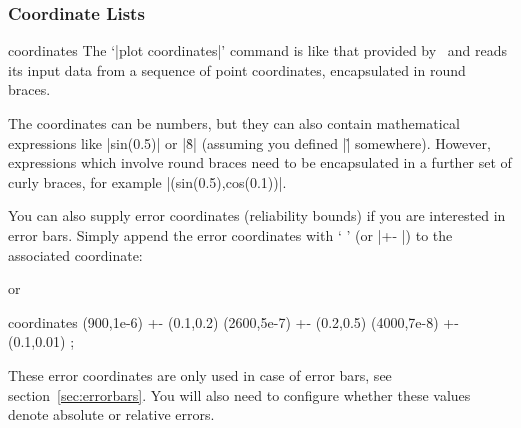 {\begin{addplot+}
\begin{codeexample}[]
\end{codeexample}
\end{addplot+}

\subsubsection{Coordinate Lists}
\label{pgfplots:providing:input}

\begin{addplotoperation}[]{coordinates}{}
\label{pgfplots:addplot:coordinates}
The `|plot coordinates|' command is like that provided by \Tikz\ and reads its input data from a sequence of point coordinates, encapsulated in round braces.
\begin{codeexample}[]
\end{codeexample}
\noindent The coordinates can be numbers, but they can also contain mathematical expressions like |sin(0.5)| or |\h*8| (assuming you defined |\h| somewhere). However, expressions which involve round braces need to be encapsulated in a further set of curly braces, for example |({sin(0.5)},{cos(0.1)})|.

You can also supply error coordinates (reliability bounds) if you are interested in error bars. Simply append the error coordinates with `\declareandlabel{+-} ' (or |+- |) to the associated coordinate:
\begin{codeexample}[]
\end{codeexample}
or 
\begin{codeexample}
\addplot coordinates {
	 (900,1e-6) +- (0.1,0.2)
	(2600,5e-7) +- (0.2,0.5)
	(4000,7e-8) +- (0.1,0.01)
};
\end{codeexample}
These error coordinates are only used in case of error bars, see section~\ref{sec:errorbars}. You will also need to configure whether these values denote absolute or relative errors.


\end{addplotoperation}}
